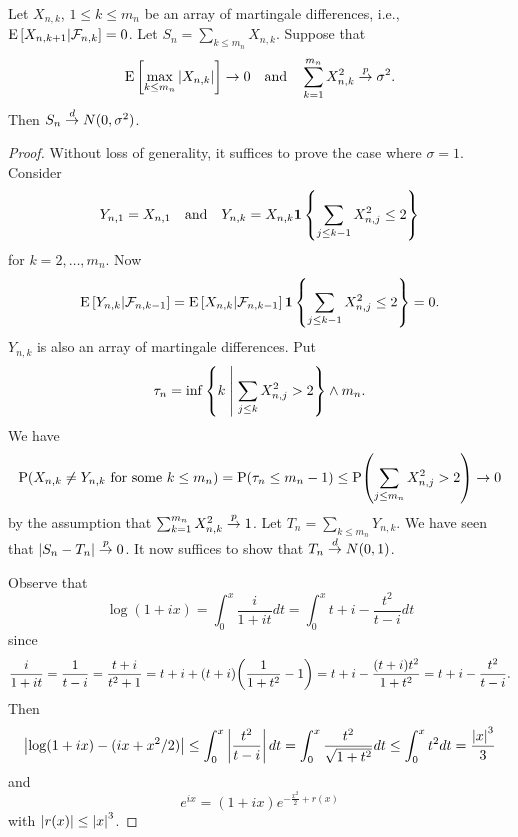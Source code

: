\begin{theorem}
    Let $X_{n,k}$, $1\leq k\leq m_n$ be an array of martingale differences, 
    i.e., $\operatorname{E}\left[ {X_{n,k+1}|\mathcal{F}_{n,k}} \right] = 0$. Let $S_n = \sum_{k\leq m_n}X_{n,k}$. 
    Suppose that 
    \begin{equation*}
        \operatorname{E}\left[ {\max_{k\leq m_n}\left\lvert {X_{n,k}} \right\rvert} \right]\to 0\quad\text{and}\quad 
        \sum_{k=1}^{m_n}X_{n,k}^2\overset{p}{\to} \sigma^2. 
    \end{equation*}
    Then $S_n\overset{d}{\to} N(0,\sigma^2)$. 
\end{theorem}
\begin{proof}
    Without loss of generality, it suffices to prove the case where $\sigma = 1$. 
    Consider 
    \begin{equation*}
        Y_{n,1} = X_{n,1}\quad\text{and}\quad 
        Y_{n,k} = X_{n,k}\mathbf{1}\left\{ {\sum_{j\leq k-1}X_{n,j}^2\leq 2} \right\}
    \end{equation*}
    for $k = 2,\ldots,m_n$. Now 
    \begin{equation*}
        \operatorname{E}\left[ {Y_{n,k}|\mathcal{F}_{n,k-1}} \right] = \operatorname{E}\left[ {X_{n,k}|\mathcal{F}_{n,k-1}} \right]\mathbf{1}\left\{ {\sum_{j\leq k-1}X_{n,j}^2\leq 2} \right\} = 0.
    \end{equation*}
    $Y_{n,k}$ is also an array of martingale differences. Put 
    \begin{equation*}
        \tau_n = \inf\left\{ k \;\middle\vert\; \sum_{j\leq k}X_{n,j}^2 > 2 \right\}\wedge m_n.
    \end{equation*}
    We have 
    \begin{equation*}
        \P(X_{n,k}\neq Y_{n,k}\text{ for some $k\leq m_n$}) = \P(\tau_n\leq m_n-1) 
        \leq \P\pth{\sum_{j\leq m_n}X_{n,j}^2 > 2}\to 0
    \end{equation*}
    by the assumption that $\sum_{k=1}^{m_n}X_{n,k}^2\overset{p}{\to} 1$. Let $T_n = \sum_{k\leq m_n}Y_{n,k}$. 
    We have seen that $\left\lvert {S_n-T_n} \right\rvert\overset{p}{\to} 0$. It now suffices to show that 
    $T_n\overset{d}{\to} N(0,1)$. 
    
    Observe that 
    \begin{equation*}
        \log(1+ix) = \int_0^x\frac{i}{1+it}dt = \int_0^x t+i-\frac{t^2}{t-i}dt 
    \end{equation*} 
    since 
    \begin{equation*}
        \frac{i}{1+it} = \frac{1}{t-i} = \frac{t+i}{t^2+1} = t+i + (t+i)\pth{\frac{1}{1+t^2}-1} 
        = t+i - \frac{(t+i)t^2}{1+t^2} = t+i-\frac{t^2}{t-i}.
    \end{equation*}
    Then 
    \begin{equation*}
        \left\lvert {\log(1+ix)-(ix + x^2/2)} \right\rvert\leq \int_0^x\left\lvert {\frac{t^2}{t-i}} \right\rvert dt 
        = \int_0^x\frac{t^2}{\sqrt{1+t^2}}dt 
        \leq \int_0^xt^2dt = \frac{\left\lvert {x} \right\rvert^3}{3}
    \end{equation*}
    and 
    \begin{equation*}
        e^{ix} = (1+ix)e^{-\frac{x^2}{2}+r(x)}
    \end{equation*}
    with $\left\lvert {r(x)} \right\rvert\leq \left\lvert {x} \right\rvert^3$. 


\end{proof}
